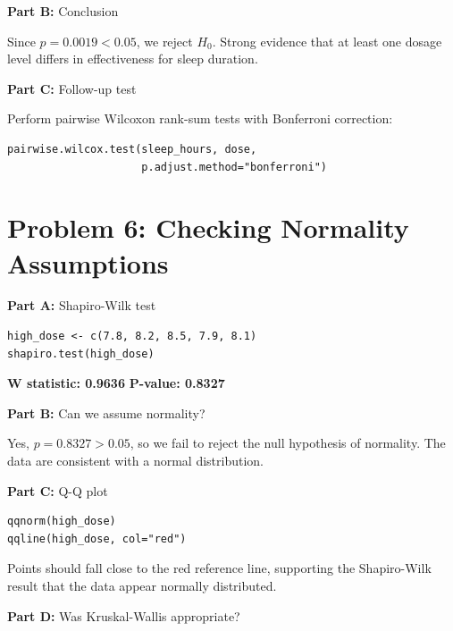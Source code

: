 \documentclass[11pt]{article}
\begin{document}
\vspace{6pt}

\textbf{Part B:} Conclusion

Since $p = 0.0019 < 0.05$, we reject $H_0$. Strong evidence that at least one dosage level differs in effectiveness for sleep duration.

\vspace{6pt}

\textbf{Part C:} Follow-up test

Perform pairwise Wilcoxon rank-sum tests with Bonferroni correction:

\begin{lstlisting}
pairwise.wilcox.test(sleep_hours, dose,
                     p.adjust.method="bonferroni")
\end{lstlisting}

\newpage

\section{Problem 6: Checking Normality Assumptions}

\textbf{Part A:} Shapiro-Wilk test

\begin{lstlisting}
high_dose <- c(7.8, 8.2, 8.5, 7.9, 8.1)
shapiro.test(high_dose)
\end{lstlisting}

\textbf{W statistic: 0.9636} \quad \textbf{P-value: 0.8327}

\vspace{6pt}

\textbf{Part B:} Can we assume normality?

Yes, $p = 0.8327 > 0.05$, so we fail to reject the null hypothesis of normality. The data are consistent with a normal distribution.

\vspace{6pt}

\textbf{Part C:} Q-Q plot

\begin{lstlisting}
qqnorm(high_dose)
qqline(high_dose, col="red")
\end{lstlisting}

Points should fall close to the red reference line, supporting the Shapiro-Wilk result that the data appear normally distributed.

\vspace{6pt}

\textbf{Part D:} Was Kruskal-Wallis appropriate?
\end{document}
